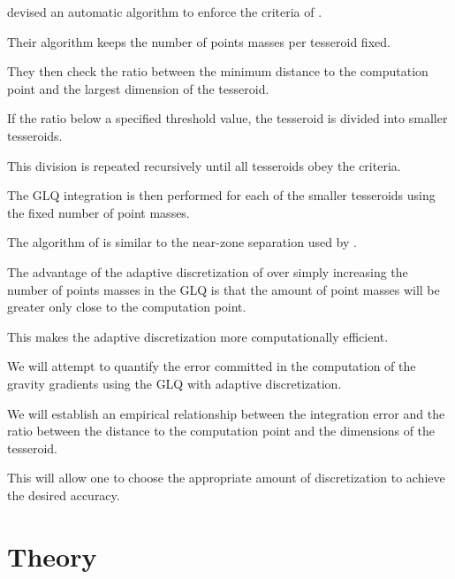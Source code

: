 \documentclass[paper,twocolumn]{geophysics}
\begin{document}
\citet{Li2011} devised an automatic algorithm to enforce the criteria of
\citet{Ku1977}.

Their algorithm keeps the number of points masses per tesseroid fixed.

They then check the ratio between the minimum distance to the computation point
and the largest dimension of the tesseroid.

If the ratio below a specified threshold value, the tesseroid is divided into
smaller tesseroids.

This division is repeated recursively until all tesseroids obey the criteria.

The GLQ integration is then performed for each of the smaller tesseroids
using the fixed number of point masses.

The algorithm of \citet{Li2011} is similar to the near-zone separation used by
\citet{Grombein2013}.

The advantage of the adaptive discretization of \citet{Li2011} over simply
increasing the number of points masses in the GLQ is that the
amount of point masses will be greater only close to the computation point.

This makes the adaptive discretization more computationally efficient.


We will attempt to quantify the error committed in the computation of the
gravity gradients using the GLQ with adaptive discretization.

We will establish an empirical relationship between the integration error and
the ratio between the distance to the computation point and the dimensions of
the tesseroid.

This will allow one to choose the appropriate amount of discretization to
achieve the desired accuracy.


\section{Theory}
\end{document}
